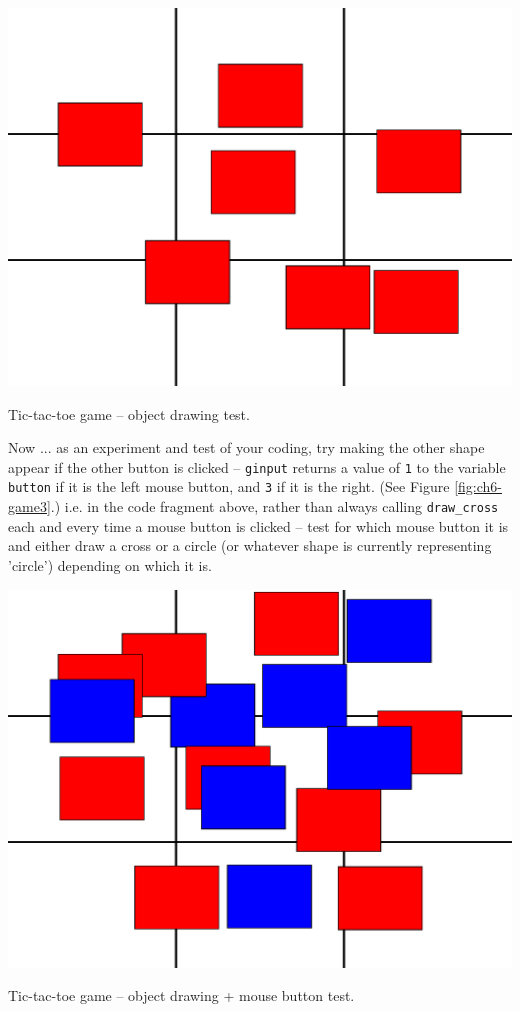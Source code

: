 \documentclass{tufte-book} %
\begin{document}
\begin{marginfigure}[-0.0in]
\includegraphics[width=\linewidth]{ch6-game2.eps}
\caption{Tic-tac-toe game -- object drawing test.}
\label{fig:ch6-game2}
\end{marginfigure}

Now ... as an experiment and test of your coding, try making the other shape appear if the other button is clicked -- \texttt{ginput} returns a value of \texttt{1} to the variable \texttt{button} if it is the left mouse button, and \texttt{3} if it is the right. (See Figure \ref{fig:ch6-game3}.)
i.e. in the code fragment above, rather than always calling \texttt{draw\_cross} each and every time a mouse button is clicked -- test for which mouse button it is and either draw a cross or a circle (or whatever shape is currently representing 'circle') depending on which it is.
 
\begin{marginfigure}[-0in]
\includegraphics[width=\linewidth]{ch6-game3.eps}
\caption{Tic-tac-toe game -- object drawing + mouse button test.}
\label{fig:ch6-game3}
\end{marginfigure}
\end{document}

